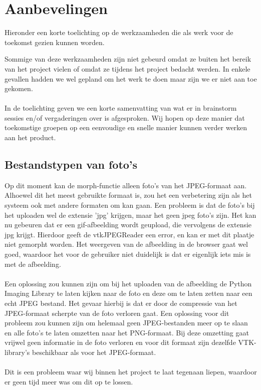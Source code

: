 \section{Aanbevelingen} %
\label{Aanbevelingen}
Hieronder een korte toelichting op de werkzaamheden die als werk voor de toekomst gezien kunnen worden.

Sommige van deze werkzaamheden zijn niet gebeurd omdat ze buiten het bereik van het project vielen of omdat ze tijdens het project bedacht werden. 
In enkele gevallen hadden we wel gepland om het werk te doen maar zijn we er niet aan toe gekomen.  
\\
\\
In de toelichting geven we een korte samenvatting van wat er in brainstorm sessies en/of vergaderingen over is afgesproken. 
Wij hopen op deze manier dat toekomstige groepen op een eenvoudige en snelle manier kunnen verder werken aan het product.

\subsection{Bestandstypen van foto's} %
Op dit moment kan de morph-functie alleen foto's van het JPEG-formaat aan. 
Alhoewel dit het meest gebruikte formaat is, zou het een verbetering zijn als het systeem ook met andere formaten om kan gaan. 
Een probleem is dat de foto's bij het uploaden wel de extensie 'jpg' krijgen, maar het geen jpeg foto's zijn. 
Het kan nu gebeuren dat er een gif-afbeelding wordt geupload, die vervolgens de extensie jpg krijgt. 
Hierdoor geeft de vtkJPEGReader een error, en kan er met dit plaatje niet gemorpht worden. 
Het weergeven van de afbeelding in de browser gaat wel goed, waardoor het voor de gebruiker niet duidelijk is dat er eigenlijk iets mis is met de afbeelding.
\\
\\
Een oplossing zou kunnen zijn om bij het uploaden van de afbeelding de Python Imaging Library te laten kijken naar de foto en deze om te laten zetten naar een echt JPEG bestand. 
Het gevaar hierbij is dat er door de compressie van het JPEG-formaat scherpte van de foto verloren gaat.
Een oplossing voor dit probleem zou kunnen zijn om helemaal geen JPEG-bestanden meer op te slaan en alle foto's te laten omzetten naar het PNG-formaat. Bij deze omzetting gaat vrijwel geen informatie in de foto verloren en voor dit formaat zijn dezelfde VTK-library's beschikbaar als voor het JPEG-formaat.
\\
\\
Dit is een probleem waar wij binnen het project te laat tegenaan liepen, waardoor er geen tijd meer was om dit op te lossen.

